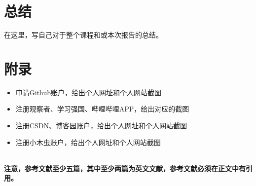 \documentclass{article}
\begin{document}
\section{总结}
在这里，写自己对于整个课程和或本次报告的总结。\par


\section{附录}
\begin{itemize}
    \item 申请Github账户，给出个人网址和个人网站截图
    \item 注册观察者、学习强国、哔哩哔哩APP，给出对应的截图
    \item 注册CSDN、博客园账户，给出个人网址和个人网站截图
    \item 注册小木虫账户，给出个人网址和个人网站截图
\end{itemize}


\hspace*{\fill} \\

{\bf 注意，参考文献至少五篇，其中至少两篇为英文文献，参考文献必须在正文中有引用。}


\end{document}
